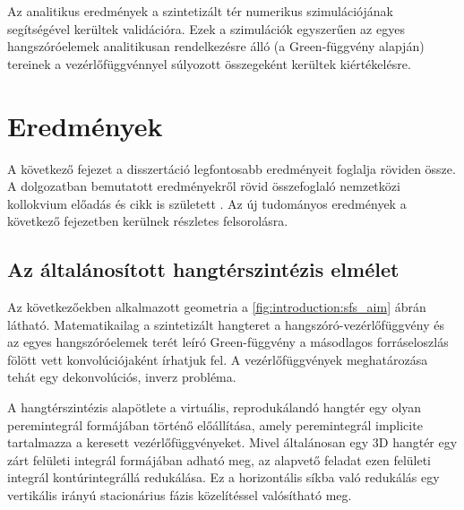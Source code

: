\documentclass[10pt,twoside]{article}
\theoremstyle{thesisgroupstyle}
\theoremstyle{indented}
\begin{document}
Az analitikus eredmények a szintetizált tér numerikus szimulációjának segítségével kerültek validációra.
Ezek a szimulációk egyszerűen az egyes hangszóróelemek analitikusan rendelkezésre álló (a Green-függvény alapján) tereinek a vezérlőfüggvénnyel súlyozott összegeként kerültek kiértékelésre. 

\section{Eredmények}

A következő fejezet a disszertáció legfontosabb eredményeit foglalja röviden össze.
A dolgozatban bemutatott eredményekről rövid összefoglaló nemzetközi kollokvium előadás és cikk is született \cite{Firtha2019:daga_booklet}.
Az új tudományos eredmények a következő fejezetben kerülnek részletes felsorolásra.

\subsection{Az általánosított hangtérszintézis elmélet}

Az következőekben alkalmazott geometria a \ref{fig:introduction:sfs_aim} ábrán látható.
Matematikailag a szintetizált hangteret a hangszóró-vezérlőfüggvény és az egyes hangszóróelemek terét leíró Green-függvény a másodlagos forráseloszlás fölött vett konvolúciójaként írhatjuk fel.
A vezérlőfüggvények meghatározása tehát egy dekonvolúciós, inverz probléma.

A hangtérszintézis alapötlete a virtuális, reprodukálandó hangtér egy olyan peremintegrál formájában történő előállítása, amely peremintegrál implicite tartalmazza a keresett vezérlőfüggvényeket.
Mivel általánosan egy 3D hangtér egy zárt felületi integrál formájában adható meg, az alapvető feladat ezen felületi integrál kontúrintegrállá redukálása.
Ez a horizontális síkba való redukálás egy vertikális irányú stacionárius fázis közelítéssel valósítható meg.
\end{document}
